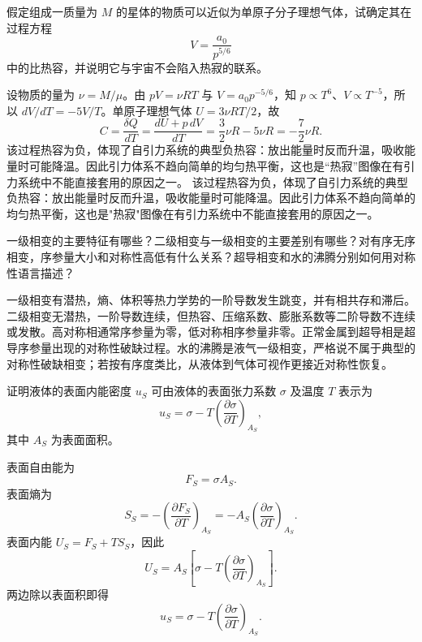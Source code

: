 \begin{question}
假定组成一质量为 $M$ 的星体的物质可以近似为单原子分子理想气体，试确定其在过程方程
\[
V=\frac{a_0}{p^{5/6}}
\]
中的比热容，并说明它与宇宙不会陷入热寂的联系。
\begin{solution}
设物质的量为 $\nu=M/\mu$。由 $pV=\nu RT$ 与 $V=a_0p^{-5/6}$，知 $p\propto T^6$、$V\propto T^{-5}$，所以 $dV/dT=-5V/T$。单原子理想气体 $U=3\nu RT/2$，故
\[
C=\frac{\delta Q}{dT}=\frac{dU+p\,dV}{dT}
=\frac32\nu R-5\nu R=-\frac72\nu R.
\]
该过程热容为负，体现了自引力系统的典型负热容：放出能量时反而升温，吸收能量时可能降温。因此引力体系不趋向简单的均匀热平衡，这也是“热寂”图像在有引力系统中不能直接套用的原因之一。
该过程热容为负，体现了自引力系统的典型负热容：放出能量时反而升温，吸收能量时可能降温。因此引力体系不趋向简单的均匀热平衡，这也是"热寂"图像在有引力系统中不能直接套用的原因之一。
\end{solution}
\end{question}

\begin{question}
一级相变的主要特征有哪些？二级相变与一级相变的主要差别有哪些？对有序无序相变，序参量大小和对称性高低有什么关系？超导相变和水的沸腾分别如何用对称性语言描述？
\begin{solution}
一级相变有潜热，熵、体积等热力学势的一阶导数发生跳变，并有相共存和滞后。二级相变无潜热，一阶导数连续，但热容、压缩系数、膨胀系数等二阶导数不连续或发散。高对称相通常序参量为零，低对称相序参量非零。正常金属到超导相是超导序参量出现的对称性破缺过程。水的沸腾是液气一级相变，严格说不属于典型的对称性破缺相变；若按有序度类比，从液体到气体可视作更接近对称性恢复。
\end{solution}
\end{question}

\begin{question}
证明液体的表面内能密度 $u_S$ 可由液体的表面张力系数 $\sigma$ 及温度 $T$ 表示为
\[
u_S=\sigma-T\left(\frac{\partial\sigma}{\partial T}\right)_{A_S},
\]
其中 $A_S$ 为表面面积。
\begin{solution}
表面自由能为
\[
F_S=\sigma A_S.
\]
表面熵为
\[
S_S=-\left(\frac{\partial F_S}{\partial T}\right)_{A_S}
=-A_S\left(\frac{\partial\sigma}{\partial T}\right)_{A_S}.
\]
表面内能 $U_S=F_S+TS_S$，因此
\[
U_S=A_S\left[\sigma-T\left(\frac{\partial\sigma}{\partial T}\right)_{A_S}\right].
\]
两边除以表面积即得
\[
u_S=\sigma-T\left(\frac{\partial\sigma}{\partial T}\right)_{A_S}.
\]
\end{solution}
\end{question}

